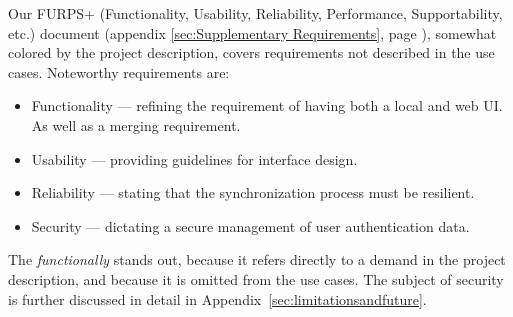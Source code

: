 Our FURPS+ (Functionality, Usability, Reliability, Performance, Supportability, etc.) document (appendix \ref{sec:Supplementary Requirements}, page \pageref{sec:Supplementary Requirements}), somewhat colored by the project description, covers requirements not described in the use cases. 
Noteworthy requirements are: 
\begin{itemize}
\item Functionality --- refining the requirement of having both a local and web UI. As well as a merging requirement.
\item Usability --- providing guidelines for interface design.
\item Reliability --- stating that the synchronization process must be resilient.
\item Security --- dictating a secure management of user authentication data.
\end{itemize}
The \emph{functionally} stands out, because it refers directly to a demand in the project description, and because it is omitted from the use cases.
The subject of security is further discussed in detail in Appendix~\ref{sec:limitationsandfuture}.
